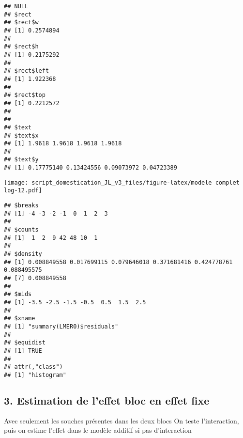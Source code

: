 \documentclass[
]{article}
\begin{document}
\begin{verbatim}
## NULL
## $rect
## $rect$w
## [1] 0.2574894
## 
## $rect$h
## [1] 0.2175292
## 
## $rect$left
## [1] 1.922368
## 
## $rect$top
## [1] 0.2212572
## 
## 
## $text
## $text$x
## [1] 1.9618 1.9618 1.9618 1.9618
## 
## $text$y
## [1] 0.17775140 0.13424556 0.09073972 0.04723389
\end{verbatim}

\texttt{[image: script\_domestication\_JL\_v3\_files/figure-latex/modele complet log-12.pdf]}

\begin{verbatim}
## $breaks
## [1] -4 -3 -2 -1  0  1  2  3
## 
## $counts
## [1]  1  2  9 42 48 10  1
## 
## $density
## [1] 0.008849558 0.017699115 0.079646018 0.371681416 0.424778761 0.088495575
## [7] 0.008849558
## 
## $mids
## [1] -3.5 -2.5 -1.5 -0.5  0.5  1.5  2.5
## 
## $xname
## [1] "summary(LMER0)$residuals"
## 
## $equidist
## [1] TRUE
## 
## attr(,"class")
## [1] "histogram"
\end{verbatim}

\hypertarget{estimation-de-leffet-bloc-en-effet-fixe}{%
\subsection{3. Estimation de l'effet bloc en effet
fixe}\label{estimation-de-leffet-bloc-en-effet-fixe}}

Avec seulement les souches présentes dans les deux blocs On teste
l'interaction, puis on estime l'effet dans le modèle additif si pas
d'interaction
\end{document}
